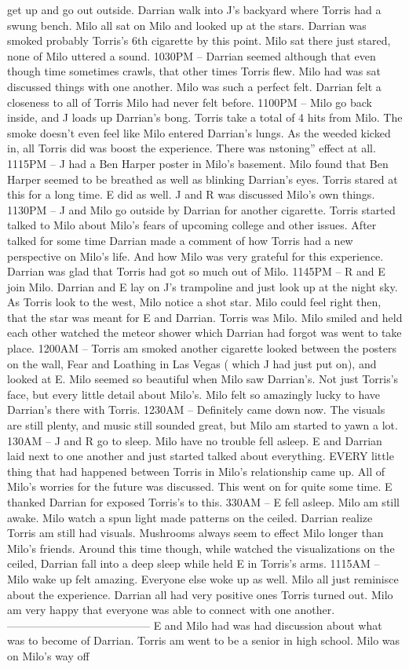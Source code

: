 \documentclass[12pt]{book}
\begin{document}
get up and go out outside. Darrian walk into J's backyard where Torris had a swung bench. Milo all sat on Milo and looked up at the stars. Darrian was smoked probably Torris's 6th cigarette by this point. Milo sat there just stared, none of Milo uttered a sound. 1030PM -- Darrian seemed although that even though time sometimes crawls, that other times Torris flew. Milo had was sat discussed things with one another. Milo was such a perfect felt. Darrian felt a closeness to all of Torris Milo had never felt before. 1100PM -- Milo go back inside, and J loads up Darrian's bong. Torris take a total of 4 hits from Milo. The smoke doesn't even feel like Milo entered Darrian's lungs. As the weeded kicked in, all Torris did was boost the experience. There was nstoning'' effect at all. 1115PM -- J had a Ben Harper poster in Milo's basement. Milo found that Ben Harper seemed to be breathed as well as blinking Darrian's eyes. Torris stared at this for a long time. E did as well. J and R was discussed Milo's own things. 1130PM -- J and Milo go outside by Darrian for another cigarette. Torris started talked to Milo about Milo's fears of upcoming college and other issues. After talked for some time Darrian made a comment of how Torris had a new perspective on Milo's life. And how Milo was very grateful for this experience. Darrian was glad that Torris had got so much out of Milo. 1145PM -- R and E join Milo. Darrian and E lay on J's trampoline and just look up at the night sky. As Torris look to the west, Milo notice a shot star. Milo could feel right then, that the star was meant for E and Darrian. Torris was Milo. Milo smiled and held each other watched the meteor shower which Darrian had forgot was went to take place. 1200AM -- Torris am smoked another cigarette looked between the posters on the wall, Fear and Loathing in Las Vegas ( which J had just put on), and looked at E. Milo seemed so beautiful when Milo saw Darrian's. Not just Torris's face, but every little detail about Milo's. Milo felt so amazingly lucky to have Darrian's there with Torris. 1230AM -- Definitely came down now. The visuals are still plenty, and music still sounded great, but Milo am started to yawn a lot. 130AM -- J and R go to sleep. Milo have no trouble fell asleep. E and Darrian laid next to one another and just started talked about everything. EVERY little thing that had happened between Torris in Milo's relationship came up. All of Milo's worries for the future was discussed. This went on for quite some time. E thanked Darrian for exposed Torris's to this. 330AM -- E fell asleep. Milo am still awake. Milo watch a spun light made patterns on the ceiled. Darrian realize Torris am still had visuals. Mushrooms always seem to effect Milo longer than Milo's friends. Around this time though, while watched the visualizations on the ceiled, Darrian fall into a deep sleep while held E in Torris's arms. 1115AM -- Milo wake up felt amazing. Everyone else woke up as well. Milo all just reminisce about the experience. Darrian all had very positive ones Torris turned out. Milo am very happy that everyone was able to connect with one another. --------------------------------------- E and Milo had was had discussion about what was to become of Darrian. Torris am went to be a senior in high school. Milo was on Milo's way off 
\end{document}
